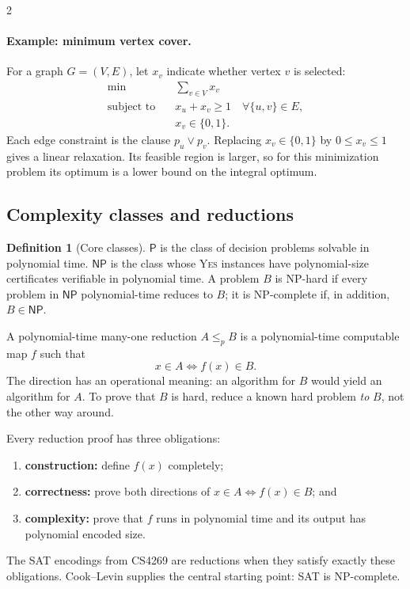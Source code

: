 \documentclass[8pt]{extarticle}
\theoremstyle{definition}
\newtheorem{definition}{Definition}[section]
\newcommand{\YES}{\textsc{Yes}}
\newcommand{\NP}{\mathsf{NP}}
\newcommand{\PTIME}{\mathsf{P}}
\begin{document}
\begin{multicols*}{2}
\paragraph{Example: minimum vertex cover.}
For a graph $G=(V,E)$, let $x_v$ indicate whether vertex $v$ is selected:
\[
\begin{aligned}
  \min\quad &\sum_{v\in V}x_v\\
  \text{subject to}\quad &x_u+x_v\ge1\quad\forall\{u,v\}\in E,\\
  &x_v\in\{0,1\}.
\end{aligned}
\]
Each edge constraint is the clause $p_u\lor p_v$.  Replacing
$x_v\in\{0,1\}$ by $0\le x_v\le1$ gives a linear relaxation.  Its feasible
region is larger, so for this minimization problem its optimum is a lower
bound on the integral optimum.

\subsection{Complexity classes and reductions}

\begin{definition}[Core classes]
$\PTIME$ is the class of decision problems solvable in polynomial time.
$\NP$ is the class whose \YES{} instances have polynomial-size certificates
verifiable in polynomial time.  A problem $B$ is NP-hard if every problem in
$\NP$ polynomial-time reduces to $B$; it is NP-complete if, in addition,
$B\in\NP$.
\end{definition}

A polynomial-time many-one reduction $A\le_p B$ is a polynomial-time
computable map $f$ such that
\[
  x\in A\iff f(x)\in B.
\]
The direction has an operational meaning: an algorithm for $B$ would yield an
algorithm for $A$.  To prove that $B$ is hard, reduce a known hard problem
\emph{to} $B$, not the other way around.

Every reduction proof has three obligations:
\begin{enumerate}
  \item \textbf{construction:} define $f(x)$ completely;
  \item \textbf{correctness:} prove both directions of
        $x\in A\iff f(x)\in B$; and
  \item \textbf{complexity:} prove that $f$ runs in polynomial time and its
        output has polynomial encoded size.
\end{enumerate}
The SAT encodings from CS4269 are reductions when they satisfy exactly these
obligations.  Cook--Levin supplies the central starting point: SAT is
NP-complete.


\end{multicols*}
\end{document}
